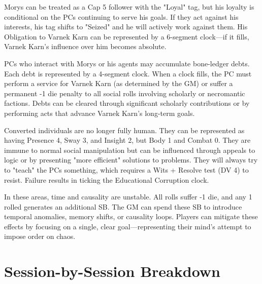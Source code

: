 \documentclass[11pt,twoside]{book}
\newenvironment{mechanicbox}[1]{%
  \begin{mdframed}[%
    linewidth=1pt,%
    linecolor=gray,%
    backgroundcolor=gray!5,%
    innertopmargin=8pt,%
    innerbottommargin=8pt,%
    innerrightmargin=8pt,%
    innerleftmargin=8pt,%
    frametitle={#1},%
    frametitlefont=\sffamily\itshape,%
  ]%
}{%
  \end{mdframed}%
}
\newcommand{\mechanic}[2]{%
  \begin{mechanicbox}{#1}
    #2
  \end{mechanicbox}
}
\begin{document}
\mechanic{Morys's Manipulation}{Morys can be treated as a Cap 5 follower with the "Loyal" tag, but his loyalty is conditional on the PCs continuing to serve his goals. If they act against his interests, his tag shifts to "Seized" and he will actively work against them. His Obligation to Varnek Karn can be represented by a 6-segment clock---if it fills, Varnek Karn's influence over him becomes absolute.}

\mechanic{Bone-Ledger Debts}{PCs who interact with Morys or his agents may accumulate bone-ledger debts. Each debt is represented by a 4-segment clock. When a clock fills, the PC must perform a service for Varnek Karn (as determined by the GM) or suffer a permanent -1 die penalty to all social rolls involving scholarly or necromantic factions. Debts can be cleared through significant scholarly contributions or by performing acts that advance Varnek Karn's long-term goals.}

\mechanic{Converted NPCs}{Converted individuals are no longer fully human. They can be represented as having Presence 4, Sway 3, and Insight 2, but Body 1 and Combat 0. They are immune to normal social manipulation but can be influenced through appeals to logic or by presenting "more efficient" solutions to problems. They will always try to "teach" the PCs something, which requires a Wits + Resolve test (DV 4) to resist. Failure results in ticking the Educational Corruption clock.}

\mechanic{Reality Fracture Zones}{In these areas, time and causality are unstable. All rolls suffer -1 die, and any 1 rolled generates an additional SB. The GM can spend these SB to introduce temporal anomalies, memory shifts, or causality loops. Players can mitigate these effects by focusing on a single, clear goal---representing their mind's attempt to impose order on chaos.}

\chapter{Session-by-Session Breakdown}
\end{document}

